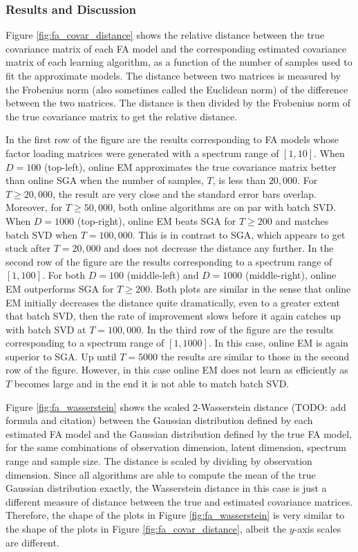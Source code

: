 \documentclass[msc,deptreport.inf]{infthesis} %
\begin{document}
\subsubsection{Results and Discussion}

Figure \ref{fig:fa_covar_distance} shows the relative distance between the true covariance matrix of each FA model and the corresponding estimated covariance matrix of each learning algorithm, as a function of the number of samples used to fit the approximate models. The distance between two matrices is measured by the Frobenius norm (also sometimes called the Euclidean norm) of the difference between the two matrices. The distance is then divided by the Frobenius norm of the true covariance matrix to get the relative distance. 

In the first row of the figure are the results corresponding to FA models whose factor loading matrices were generated with a spectrum range of $[1, 10]$. When $D=100$ (top-left), online EM approximates the true covariance matrix better than online SGA when the number of samples, $T$, is less than $20,000$. For $T \geq 20,000$, the result are very close and the standard error bars overlap. Moreover, for $T \geq 50,000$, both online algorithms are on par with batch SVD. When $D=1000$ (top-right), online EM beats SGA for $T \geq 200$ and matches batch SVD when $T=100,000$. This is in contrast to SGA, which appears to get stuck after $T=20,000$ and does not decrease the distance any further. In the second row of the figure are the results corresponding to a spectrum range of $[1, 100]$. For both $D=100$ (middle-left) and $D=1000$ (middle-right), online EM outperforms SGA for $T \geq 200$. Both plots are similar in the sense that online EM initially decreases the distance quite dramatically, even to a greater extent that batch SVD, then the rate of improvement slows before it again catches up with batch SVD at $T=100,000$. In the third row of the figure are the results corresponding to a spectrum range of $[1, 1000]$. In this case, online EM is again superior to SGA. Up until $T=5000$ the results are similar to those in the second row of the figure. However, in this case online EM does not learn as efficiently as $T$ becomes large and in the end it is not able to match batch SVD.

Figure \ref{fig:fa_wasserstein} shows the scaled 2-Wasserstein distance (TODO: add formula and citation) between the Gaussian distribution defined by each estimated FA model and the Gaussian distribution defined by the true FA model, for the same combinations of observation dimension, latent dimension, spectrum range and sample size. The distance is scaled by dividing by observation dimension. Since all algorithms are able to compute the mean of the true Gaussian distribution exactly, the Wasserstein distance in this case is just a different measure of distance between the true and estimated covariance matrices. Therefore, the shape of the plots in Figure \ref{fig:fa_wasserstein} is very similar to the shape of the plots in Figure \ref{fig:fa_covar_distance}, albeit the $y$-axis scales are different. 
\end{document}

